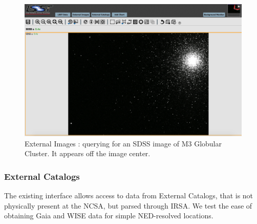 \documentclass[DM,lsstdraft,toc,usenatbib]{lsstdoc}
\begin{document}
\begin{figure}
\includegraphics[width=\textwidth]{figs/external_images_m3.png}
\caption{External Images : querying for an SDSS image of M3 Globular Cluster. It appears off the image center.}
\label{fig:ext_images_m3}
\end{figure}



\subsubsection{External Catalogs}
\label{sec:ext_catalogs}

The existing interface allows access to data from External Catalogs,  that is not physically present at the NCSA, but parsed through IRSA. We test the ease of obtaining Gaia and WISE data for simple NED-resolved locations. 
\end{document}
